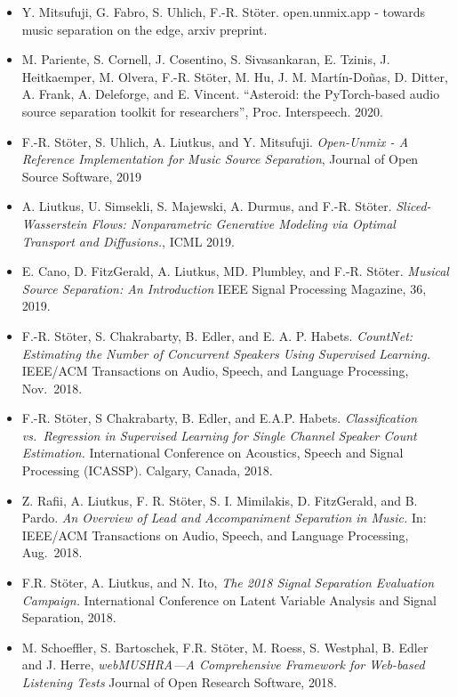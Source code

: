 \documentclass[a4paper,11pt]{article}
\providecommand{\tightlist}{%
  \setlength{\itemsep}{0pt}\setlength{\parskip}{0pt}}
\begin{document}
\begin{itemize}
\tightlist
\item 
  Y. Mitsufuji, G. Fabro, S. Uhlich, F.-R. Stöter. open.unmix.app - towards music separation on the edge, arxiv preprint.
\item 
  M. Pariente, S. Cornell, J. Cosentino, S. Sivasankaran, E. Tzinis, J. Heitkaemper, M. Olvera, F.-R. Stöter, M. Hu, J. M. Martín-Doñas, D. Ditter, A. Frank, A. Deleforge, and E. Vincent. “Asteroid: the PyTorch-based audio source separation toolkit for researchers”,  Proc. Interspeech. 2020.
\item
  F.-R. Stöter, S. Uhlich, A. Liutkus, and Y. Mitsufuji.
  \emph{Open-Unmix - A Reference Implementation for Music Source Separation},
  Journal of Open Source Software, 2019
\item
  A. Liutkus, U. Simsekli, S. Majewski, A. Durmus, and F.-R. Stöter.
  \emph{Sliced-Wasserstein Flows: Nonparametric Generative Modeling via
  Optimal Transport and Diffusions.}, ICML 2019.
\item
  E. Cano, D. FitzGerald, A. Liutkus, MD. Plumbley, and F.-R. Stöter.
  \emph{Musical Source Separation: An Introduction} IEEE Signal
  Processing Magazine, 36, 2019.
\item
  F.-R. Stöter, S. Chakrabarty, B. Edler, and E. A. P. Habets.
  \emph{CountNet: Estimating the Number of Concurrent Speakers Using
  Supervised Learning.} IEEE/ACM Transactions on Audio, Speech, and
  Language Processing, Nov.~2018.
\item
  F.-R. Stöter, S Chakrabarty, B. Edler, and E.A.P. Habets.
  \emph{Classification vs.~Regression in Supervised Learning for Single
  Channel Speaker Count Estimation.} International Conference on
  Acoustics, Speech and Signal Processing (ICASSP). Calgary, Canada,
  2018.
\item
  Z. Rafii, A. Liutkus, F. R. Stöter, S. I. Mimilakis, D.
  FitzGerald, and B. Pardo. \emph{An Overview of Lead and Accompaniment
  Separation in Music.} In: IEEE/ACM Transactions on Audio, Speech, and
  Language Processing, Aug.~2018.
\item
  F.R. Stöter, A. Liutkus, and N. Ito, \emph{The 2018 Signal
  Separation Evaluation Campaign.} International Conference on Latent
  Variable Analysis and Signal Separation, 2018.
\item
  M. Schoeffler, S. Bartoschek, F.R. Stöter, M. Roess, S.
  Westphal, B. Edler and J. Herre, \emph{webMUSHRA---A Comprehensive
  Framework for Web-based Listening Tests} Journal of Open Research
  Software, 2018.

\end{itemize}
\end{document}
